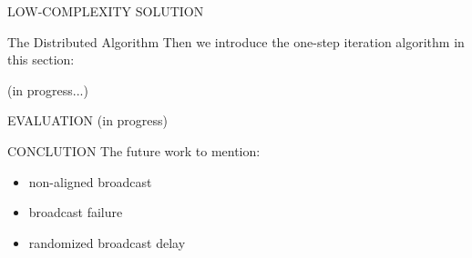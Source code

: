 \documentclass[10pt, conference, letterpaper]{IEEEtran}
\renewcommand{\vec}{\mathbf}
\begin{document}
\begin{section}{LOW-COMPLEXITY SOLUTION}
        \begin{subsection}{The Distributed Algorithm}
            Then we introduce the one-step iteration algorithm in this section:
            \begin{algorithm}[H]
                \caption{Distributed Algorithm for $k$-th AP}
                \begin{algorithmic}
                    \WHILE{\TRUE}
                        \STATE (in progress...)
                    \ENDWHILE
                \end{algorithmic}
            \end{algorithm}
        \end{subsection}
        
    \end{section}

    \begin{section}{EVALUATION}
        \label{sec:evaluation}
        (in progress)
    \end{section}

    \begin{section}{CONCLUTION}
        \label{sec:conclusion}
        The future work to mention:
        \begin{itemize}
            \item non-aligned broadcast
            \item broadcast failure
            \item randomized broadcast delay
        \end{itemize}
    \end{section}

    
    
\end{document}
